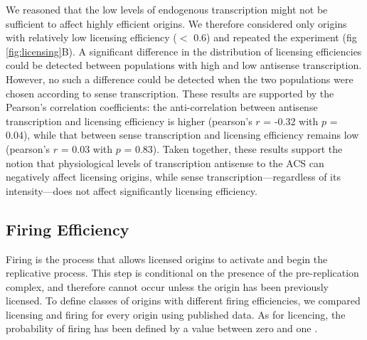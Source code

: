 We reasoned that the low levels of endogenous transcription might not be sufficient to affect highly efficient origins. We therefore considered only origins with relatively low licensing efficiency ($<$ 0.6) and repeated the experiment (fig \ref{fig:licensing}B). 
A significant difference in the distribution of licensing efficiencies could be detected between populations with high and low antisense transcription. 
However, no such a difference could be detected when the two populations were chosen according to sense transcription. 
These results are supported by the Pearson’s correlation coefficients: the anti-correlation between antisense transcription and licensing efficiency is higher (pearson’s $r$ = -0.32 with $p$ = 0.04), while that between sense transcription and licensing efficiency remains low (pearson’s $r$ = 0.03 with $p$ = 0.83). 
Taken together, these results support the notion that physiological levels of transcription antisense to the ACS can negatively affect licensing origins, while sense transcription—regardless of its intensity—does not affect significantly licensing efficiency.



\subsection{Firing Efficiency}

Firing is the process that allows licensed origins to activate and begin the replicative process. This step is conditional on the presence of the pre-replication complex, and therefore cannot occur unless the origin has been previously licensed. To define classes of origins with different firing efficiencies, we compared licensing and firing for every origin using published data. As for licencing, the probability of firing has been defined by a value between zero and one \cite{hawkins:2013:highresolution}.

